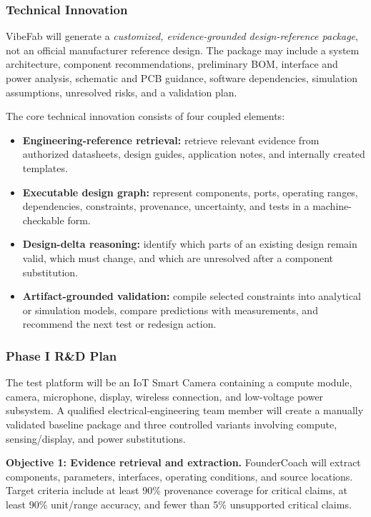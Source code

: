 \documentclass[12pt,letterpaper]{article}
\begin{document}
\subsubsection{Technical Innovation}

VibeFab will generate a \emph{customized, evidence-grounded design-reference package}, not an official manufacturer reference design. The package may include a system architecture, component recommendations, preliminary BOM, interface and power analysis, schematic and PCB guidance, software dependencies, simulation assumptions, unresolved risks, and a validation plan.

The core technical innovation consists of four coupled elements:

\begin{itemize}
    \item \textbf{Engineering-reference retrieval:} retrieve relevant evidence from authorized datasheets, design guides, application notes, and internally created templates.
    \item \textbf{Executable design graph:} represent components, ports, operating ranges, dependencies, constraints, provenance, uncertainty, and tests in a machine-checkable form.
    \item \textbf{Design-delta reasoning:} identify which parts of an existing design remain valid, which must change, and which are unresolved after a component substitution.
    \item \textbf{Artifact-grounded validation:} compile selected constraints into analytical or simulation models, compare predictions with measurements, and recommend the next test or redesign action.
\end{itemize}

\subsubsection{Phase I R\&D Plan}

The test platform will be an IoT Smart Camera containing a compute module, camera, microphone, display, wireless connection, and low-voltage power subsystem. A qualified electrical-engineering team member will create a manually validated baseline package and three controlled variants involving compute, sensing/display, and power substitutions.

\textbf{Objective 1: Evidence retrieval and extraction.} FounderCoach will extract components, parameters, interfaces, operating conditions, and source locations. Target criteria include at least 90\% provenance coverage for critical claims, at least 90\% unit/range accuracy, and fewer than 5\% unsupported critical claims.
\end{document}
